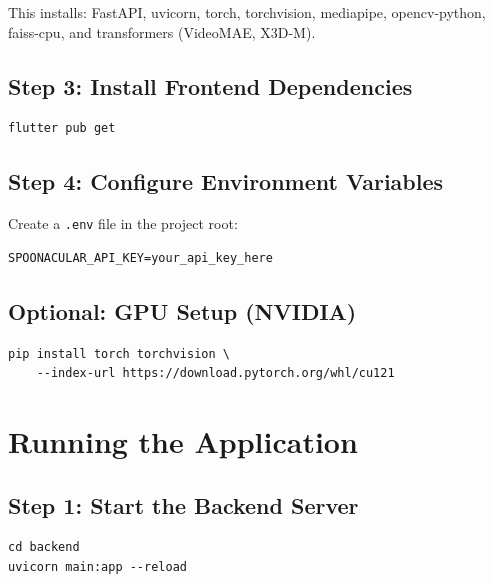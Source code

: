 \large
This installs: FastAPI, uvicorn, torch, torchvision, mediapipe, opencv-python, faiss-cpu, and transformers (VideoMAE, X3D-M).
\normalsize

\subsection*{Step 3: Install Frontend Dependencies}

\begin{codebox}
\begin{verbatim}
flutter pub get
\end{verbatim}
\end{codebox}

\subsection*{Step 4: Configure Environment Variables}

Create a \texttt{.env} file in the project root:

\begin{codebox}
\begin{verbatim}
SPOONACULAR_API_KEY=your_api_key_here
\end{verbatim}
\end{codebox}

\subsection*{Optional: GPU Setup (NVIDIA)}

\begin{codebox}
\begin{verbatim}
pip install torch torchvision \
    --index-url https://download.pytorch.org/whl/cu121
\end{verbatim}
\end{codebox}

\section{Running the Application}
\label{sec:running}

\subsection*{Step 1: Start the Backend Server}

\begin{codebox}
\begin{verbatim}
cd backend
uvicorn main:app --reload
\end{verbatim}
\end{codebox}

